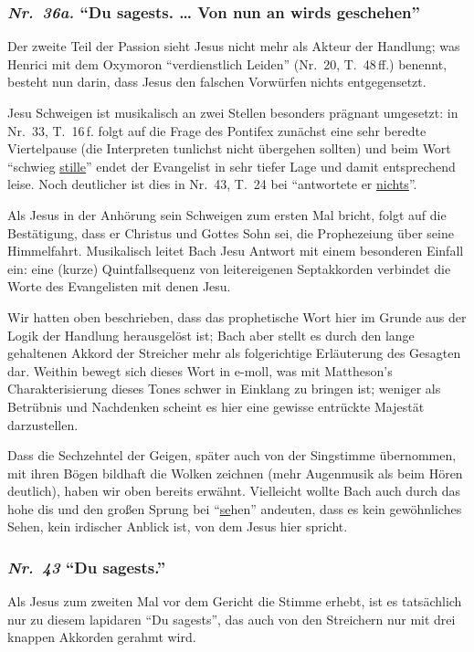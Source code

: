 \documentclass[a4paper,11pt,twoside]{scrartcl}
\newcommand{\Nr}[1]{\textmd{\textit{Nr.~#1}}}
\begin{document}
\subsubsection*{\Nr{36a.} \enquote{Du sagests. … Von nun an wirds geschehen}}
Der zweite Teil der Passion sieht Jesus nicht mehr als Akteur der
Handlung; was Henrici mit dem Oxymoron \enquote{verdienstlich Leiden}
(Nr.~20, T.~48\,ff.) benennt, besteht nun darin, dass Jesus den falschen
Vorwürfen nichts entgegensetzt.

Jesu Schweigen ist musikalisch an zwei Stellen besonders prägnant umgesetzt:
in Nr.~33, T.~16\,f. folgt auf die Frage des Pontifex zunächst eine sehr
beredte Viertelpause (die Interpreten tunlichst nicht übergehen sollten)
und beim Wort \enquote{schwieg \underline{stille}} endet der Evangelist
in sehr tiefer Lage und damit entsprechend leise.  Noch deutlicher ist
dies in Nr.~43, T.~24 bei \enquote{antwortete er \underline{nichts}}.

Als Jesus in der Anhörung sein Schweigen zum ersten Mal bricht, folgt
auf die Bestätigung, dass er Christus und Gottes Sohn sei, die
Prophezeiung über seine Himmelfahrt.  Musikalisch leitet Bach Jesu
Antwort mit einem besonderen Einfall ein: eine (kurze) Quintfallsequenz
von leitereigenen Septakkorden verbindet die Worte des Evangelisten
mit denen Jesu.

Wir hatten oben beschrieben, dass das prophetische Wort hier im Grunde
aus der Logik der Handlung herausgelöst ist; Bach aber stellt es durch
den lange gehaltenen Akkord der Streicher mehr als folgerichtige
Erläuterung des Gesagten dar.  Weithin bewegt sich dieses Wort in
e-moll, was mit Mattheson’s Charakterisierung dieses Tones schwer in
Einklang zu bringen ist; weniger als Betrübnis und Nachdenken scheint
es hier eine gewisse entrückte Majestät darzustellen.

Dass die Sechzehntel der Geigen, später auch von der Singstimme
übernommen, mit ihren Bögen bildhaft die Wolken zeichnen (mehr
Augenmusik als beim Hören deutlich), haben wir oben bereits
erwähnt.  Vielleicht wollte Bach auch durch das hohe dis und
den großen Sprung bei \enquote{\underline{se}hen} andeuten, dass
es kein gewöhnliches Sehen, kein irdischer Anblick ist, von dem
Jesus hier spricht.

\subsubsection*{\Nr{43} \enquote{Du sagests.}}
Als Jesus zum zweiten Mal vor dem Gericht die Stimme erhebt, ist es
tatsächlich nur zu diesem lapidaren \enquote{Du sagests}, das auch
von den Streichern nur mit drei knappen Akkorden gerahmt wird.
\end{document}
